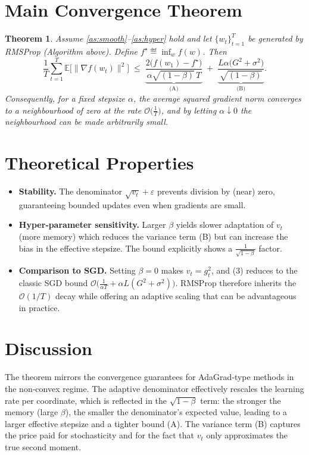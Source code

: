 \documentclass{article}
\newtheorem{theorem}{Theorem}
\begin{document}
\section*{Main Convergence Theorem}
\begin{theorem}\label{thm:main}
Assume \ref{as:smooth}–\ref{as:hyper} hold and let $\{w_{t}\}_{t=1}^{T}$ be generated by RMSProp (Algorithm above).  
Define $f^{\star}\eqdef\inf_{w}f(w)$. Then
\[
\frac{1}{T}\sum_{t=1}^{T}\mathbb{E}\big[\|\nabla f(w_{t})\|^{2}\big]
\;\le\;
\underbrace{\frac{2\big(f(w_{1})-f^{\star}\big)}{\alpha\sqrt{(1-\beta)}\,T}}_{\text{(A)}}
\;+\;
\underbrace{\frac{L\alpha\big(G^{2}+\sigma^{2}\big)}{\sqrt{(1-\beta)}}}_{\text{(B)}} .
\tag{3}
\]
Consequently, for a fixed stepsize $\alpha$, the average squared gradient norm converges to a neighbourhood of zero at the rate $\mathcal{O}\!\big(\tfrac{1}{T}\big)$, and by letting $\alpha\downarrow0$ the neighbourhood can be made arbitrarily small.
\end{theorem}

\section*{Theoretical Properties}
\begin{itemize}
\item \textbf{Stability.} The denominator $\sqrt{v_{t}}+\varepsilon$ prevents division by (near) zero, guaranteeing bounded updates even when gradients are small.
\item \textbf{Hyper‑parameter sensitivity.} Larger $\beta$ yields slower adaptation of $v_{t}$ (more memory) which reduces the variance term (B) but can increase the bias in the effective stepsize. The bound explicitly shows a $\frac{1}{\sqrt{1-\beta}}$ factor.
\item \textbf{Comparison to SGD.} Setting $\beta=0$ makes $v_{t}=g_{t}^{2}$, and (3) reduces to the classic SGD bound $\mathcal{O}\big(\frac{1}{\alpha T}+\alpha L(G^{2}+\sigma^{2})\big)$. RMSProp therefore inherits the $\mathcal{O}(1/T)$ decay while offering an adaptive scaling that can be advantageous in practice.
\end{itemize}

\section*{Discussion}
The theorem mirrors the convergence guarantees for AdaGrad‑type methods in the non‑convex regime. The adaptive denominator effectively rescales the learning rate per coordinate, which is reflected in the $\sqrt{1-\beta}$ term: the stronger the memory (large $\beta$), the smaller the denominator’s expected value, leading to a larger effective stepsize and a tighter bound (A). The variance term (B) captures the price paid for stochasticity and for the fact that $v_{t}$ only approximates the true second moment.
\end{document}

